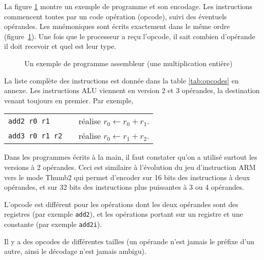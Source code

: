 \documentclass[architecture]{compas2018}
\begin{document}
La figure \ref{fig:exempleasm} montre un exemple de programme et son encodage.
Les instructions commencent toutes par un code opération (opcode), suivi des éventuels opérandes.
Les mnémoniques sont écrits exactement dans le même ordre (figure~\ref{fig:exempleasm}).  
Une fois que le processeur a reçu l'opcode, il sait combien d'opérande il doit recevoir et quel est leur type.


\begin{figure}[b] 
  \centering {\small \tt \progex}
  \caption{Un exemple de programme assembleur (une multiplication entière)}
  \label{fig:exempleasm}
\iffalse
  let r0 17        ; 0111 000 1000010001 ; 000 encode r0,  17 est encodé sur 10 bits
boucle:	                                 ; ceci est une étiquette (label)
  sub2i r0 1       ; 0011 000 01         ; 000 encode r0, 01 encode la constante 1
  jumpif nz boucle ; 1011 001 011100111  ;jumpif nz -25, encodé en 16 bits en tout 
\fi
\end{figure}

La liste complète des instructions est donnée dans la table \ref{tab:opcodes} en annexe.
Les instructions ALU viennent en version 2 et 3 opérandes, la destination venant toujours en premier.
Par exemple, \\
  \begin{tabular}{lcl}
 \texttt{add2 r0 r1}&& réalise $r_0 \leftarrow r_0+r_1$. \\
 \texttt{add3 r0 r1 r2}&& réalise $r_0 \leftarrow r_1+r_2$.
  \end{tabular}
  
  Dans les programmes écrits à la main, il faut constater qu'on a utilisé surtout les versions à 2 opérandes.
  Ceci est similaire à l'évolution du jeu d'instruction ARM vers le mode Thumb2 qui permet d'encoder sur 16 bits des instructions à deux opérandes, et sur 32 bits des instructions plus puissantes à 3 ou 4 opérandes.  
  
 L'opcode est différent pour les opérations dont les deux opérandes  sont des registres (par exemple \texttt{add2}), et les opérations portant sur un registre et une constante (par exemple \texttt{add2i}).

 Il y a des opcodes de différentes tailles (un opérande n'est jamais le préfixe d'un autre, ainsi le décodage n'est jamais ambigu).
\end{document}
